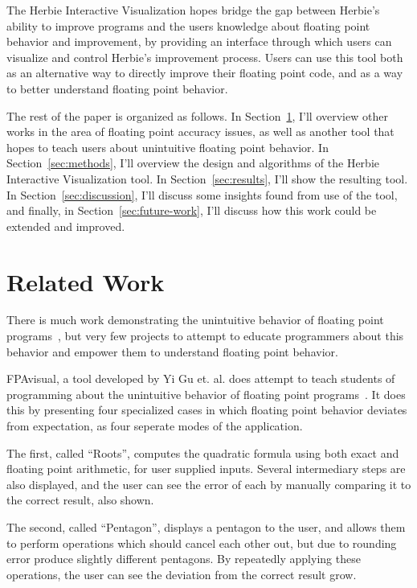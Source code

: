 \documentclass{chi2009}
\begin{document}
The Herbie Interactive Visualization hopes bridge the gap between
Herbie's ability to improve programs and the users knowledge about
floating point behavior and improvement, by providing an interface
through which users can visualize and control Herbie's improvement
process. Users can use this tool both as an alternative way to
directly improve their floating point code, and as a way to better
understand floating point behavior.

The rest of the paper is organized as follows. In
Section~\ref{sec:related}, I'll overview other works in the area of
floating point accuracy issues, as well as another tool that hopes to
teach users about unintuitive floating point behavior. In
Section~\ref{sec:methods}, I'll overview the design and algorithms of
the Herbie Interactive Visualization tool. In
Section~\ref{sec:results}, I'll show the resulting tool. In
Section~\ref{sec:discussion}, I'll discuss some insights found from
use of the tool, and finally, in Section~\ref{sec:future-work}, I'll
discuss how this work could be extended and improved.

\section{Related Work}
\label{sec:related}

There is much work demonstrating the unintuitive behavior of floating
point programs~\cite{berkeley00-needle-like, kahan-java-hurts,
  cse14-practical-fp}, but very few projects to attempt to educate
programmers about this behavior and empower them to understand
floating point behavior.

FPAvisual, a tool developed by Yi Gu et. al. does attempt to teach
students of programming about the unintuitive behavior of floating
point programs~\cite{fpavisual}. It does this by presenting four
specialized cases in which floating point behavior deviates from
expectation, as four seperate modes of the application.

The first, called ``Roots'', computes the quadratic formula using both
exact and floating point arithmetic, for user supplied inputs. Several
intermediary steps are also displayed, and the user can see the error
of each by manually comparing it to the correct result, also shown.

The second, called ``Pentagon'', displays a pentagon to the user, and
allows them to perform operations which should cancel each other out,
but due to rounding error produce slightly different pentagons. By
repeatedly applying these operations, the user can see the deviation
from the correct result grow.
\end{document}

